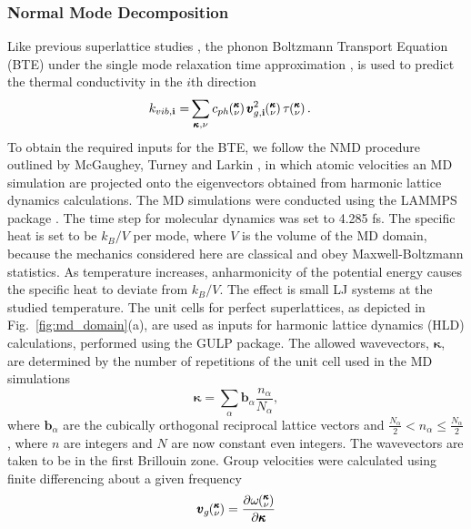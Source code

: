 \documentclass[aps,prb,preprint,preprintnumbers,amsmath,amssymb,floatfix,superscriptaddress]{revtex4}
\newcommand{\kv}{\mspace{-4.0mu}\left(\mspace{-8.0mu}
\begin{smallmatrix}&\pmb{\kappa} \\&\nu\end{smallmatrix}
\mspace{-3.0mu}\right)}
\begin{document}
\subsubsection{Normal Mode Decomposition}
Like previous superlattice studies \cite{Luckyanova16112012,doi:10.1021/nl202186y}, the phonon Boltzmann Transport Equation (BTE) under the single mode relaxation time approximation \cite{ziman_electrons_2001}, is used to predict the thermal conductivity in the $i$th direction
\begin{equation}\label{EQ:M:conductivity}
\begin{split}
k_{vib,\mathbf{i}}=&\sum_{\pmb{\kappa},\nu} c_{ph}\kv
\pmb{v}^{2}_{g,\mathbf{i}}\kv \tau\kv.
\end{split}
\end{equation}
To obtain the required inputs for the BTE, we follow the NMD procedure outlined by McGaughey\cite{PhysRevB.71.184305}, Turney \cite {PhysRevB.81.081411} and Larkin \cite{jason_inpress}, in which atomic velocities an MD simulation are projected onto the eigenvectors obtained from harmonic lattice dynamics calculations. The MD simulations were conducted using the LAMMPS package \cite{LAMMPS}. The time step for molecular dynamics was set to 4.285 fs. The specific heat is set to be $k_B/V$ per mode, where $V$ is the volume of the MD domain, because the mechanics considered here are classical and obey Maxwell-Boltzmann statistics. As temperature increases, anharmonicity of the potential energy causes the specific heat to deviate from $k_B/V$. The effect is small LJ systems at the studied temperature\cite{jason_inpress}. The unit cells for perfect superlattices, as depicted in Fig.~\ref{fig:md_domain}(a), are used as inputs for harmonic lattice dynamics (HLD) calculations, performed using the GULP package\cite{GULP}. The allowed wavevectors, $\pmb{\kappa}$, are determined by the number of repetitions of the unit cell used in the MD simulations
\begin{equation}\label{EQ:NMD:allowdkpt}
\pmb{\kappa} = \sum_{\alpha} \pmb{b}_{\alpha} \frac{n_{\alpha}}{N_{\alpha}},
\end{equation}
where $\pmb{b}_\alpha$ are the cubically orthogonal reciprocal lattice vectors and $ \frac{N_\alpha}{2} < n_\alpha \le \frac {N_\alpha}{2}$, where $n$ are integers and $N$ are now constant even integers. The wavevectors are taken to be in the first Brillouin zone. Group velocities were calculated using finite differencing about a given frequency
\begin{equation}\label{EQ:NMD:vg}
\begin{split}
\pmb{v}_{g}\kv=\frac{\partial \omega \kv}{\partial \pmb{\kappa}}
\end{split}
\end{equation}
\end{document}
